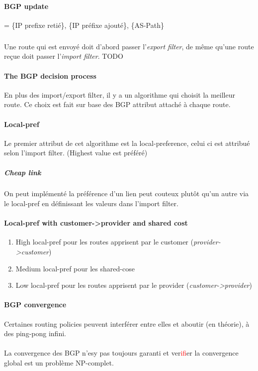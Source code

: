 \paragraph{BGP update} = \{IP prefixe retié\}, \{IP préfixe ajouté\}, \{AS-Path\}

\subparagraph{ } Une route qui est envoyé doit d'abord passer l'\textit{export filter},
de même qu'une route reçue doit passer l'\textit{import filter}.
TODO

\paragraph{The BGP decision process}
En plus des import/export filter, il y a un algorithme qui choisit la meilleur route.
Ce choix est fait sur base des BGP attribut attaché à chaque route.

\paragraph{Local-pref}
Le premier attribut de cet algorithme est la local-preference, celui ci est attribué
selon l'import filter. (Highest value est préféré)

\subparagraph{Cheap link} On peut implémenté la préférence d'un lien peut couteux
plutôt qu'un autre via le local-pref en définissant les valeurs dans l'import filter.


\paragraph{Local-pref with customer->provider and shared cost}
\begin{enumerate}
    \item High local-pref pour les routes apprisent par le customer (\textit{provider->customer})
    \item Medium local-pref pour les shared-cose
    \item Low local-pref pour les routes apprisent par le provider (\textit{customer->provider})
\end{enumerate}


\paragraph{BGP convergence}
Certaines routing policies peuvent interférer entre elles et aboutir (en théorie),
à des ping-pong infini.

\paragraph{ } La convergence des BGP n'esy pas toujours garanti et ver\textcolor{red}{if}ier la
convergence global est un problème NP-complet.

